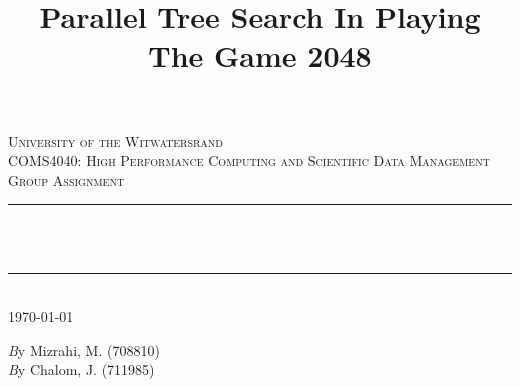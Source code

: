 \documentclass[a4paper]{article}
\title{Parallel Tree Search In Playing The Game 2048}
\author{}
\begin{document}
\begin{titlepage}

\newcommand{\HRule}{\rule{\linewidth}{0.5mm}} %

\center %
 

\textsc{\LARGE University of the Witwatersrand}\\[1.5cm] %
\textsc{\Large COMS4040: High Performance Computing and Scientific Data Management Group Assignment}\\[0.5cm] %

\makeatletter
\HRule \\[0.4cm]
{ \huge \bfseries \@title}\\[0.4cm] %
\HRule \\[1.5cm]
 
{\large \today}\\[2cm] %

\begin{minipage}{1\textwidth}
  \Large \emph By Mizrahi, M. (708810)\\
  \Large \emph By Chalom, J. (711985)\\
\end{minipage}






\end{titlepage}
\end{document}
